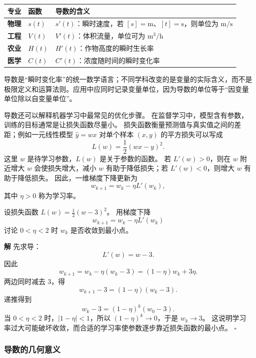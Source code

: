 \documentclass[fontset=fandol]{ctexart}
\newenvironment{solution}{\par\noindent\textbf{解}\quad}{\hfill$\square$\par\vspace{0.8em}}
\begin{document}
\begin{center}
\small
\begin{tabularx}{\textwidth}{>{\bfseries}p{1.4cm} p{2.0cm} X}
\toprule
专业 & 函数 & 导数的含义 \\
\midrule
物理 & $s(t)$ & $s'(t)$：瞬时速度，若 $[s]=\mathrm m$、$[t]=\mathrm s$，则单位为 $\mathrm{m/s}$ \\
工程 & $V(t)$ & $V'(t)$：体积流量，单位可为 $\mathrm{m^3/h}$ \\
农业 & $H(t)$ & $H'(t)$：作物高度的瞬时生长率 \\
医学 & $C(t)$ & $C'(t)$：浓度随时间的瞬时变化率 \\
\bottomrule
\end{tabularx}
\end{center}

导数是“瞬时变化率”的统一数学语言；不同学科改变的是变量的实际含义，而不是极限定义和运算法则。应用中应同时记录变量单位，因为导数的单位等于“因变量单位除以自变量单位”。


\begin{application}[导数与梯度下降的基本思想]
	
	导数还可以解释机器学习中最常见的优化步骤。 在监督学习中，模型含有参数，训练的目标通常是让损失函数尽量小。 损失函数衡量预测值与真实值之间的差距；例如一元线性模型 $\hat y=wx$ 对单个样本 $(x,y)$ 的平方损失可以写成
	\[
	L(w)=\frac12(wx-y)^2.
	\]
	这里 $w$ 是待学习参数，$L(w)$ 是关于参数的函数。 若 $L'(w)>0$，则在 $w$ 附近增大 $w$ 会使损失增大，减小 $w$ 有助于降低损失；若 $L'(w)<0$，则增大 $w$ 有助于降低损失。 因此，一维梯度下降更新为
	\[
	w_{k+1}=w_k-\eta L'(w_k),
	\]
	其中 $\eta>0$ 称为学习率。
	
	\begin{example}
		设损失函数 $L(w)=\frac12(w-3)^2$。 用梯度下降
		\[
		w_{k+1}=w_k-\eta L'(w_k)
		\]
		讨论 $0<\eta<2$ 时 $w_k$ 是否收敛到最小点。
	\end{example}
	\begin{solution}
		先求导：
		\[
		L'(w)=w-3.
		\]
		因此
		\[
		w_{k+1}=w_k-\eta(w_k-3)=(1-\eta)w_k+3\eta.
		\]
		两边同时减去 $3$，得
		\[
		w_{k+1}-3=(1-\eta)(w_k-3).
		\]
		递推得到
		\[
		w_k-3=(1-\eta)^k(w_0-3).
		\]
		当 $0<\eta<2$ 时，$|1-\eta|<1$，所以 $(1-\eta)^k\to0$，于是 $w_k\to3$。 这说明学习率过大可能破坏收敛，而合适的学习率使参数逐步靠近损失函数的最小点。
	\end{solution}
	
\end{application}


\subsubsection*{导数的几何意义}
\end{document}
